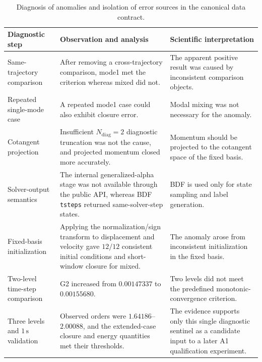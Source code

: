 \begin{table}[!ht]
\centering
\caption{Diagnosis of anomalies and isolation of error sources in the canonical data contract.}
\label{tab:canonical-diagnostic-chain}
\scriptsize
\begin{tabularx}{\textwidth}{@{}l>{\raggedright\arraybackslash}X>{\raggedright\arraybackslash}X@{}}
\toprule
Diagnostic step & Observation and analysis & Scientific interpretation \\
\midrule
Same-trajectory comparison & After removing a cross-trajectory comparison, mode1 met the criterion whereas mixed did not. & The apparent positive result was caused by inconsistent comparison objects. \\
Repeated single-mode case & A repeated mode1 case could also exhibit closure error. & Modal mixing was not necessary for the anomaly. \\
Cotangent projection & Insufficient \(N_{\mathrm{diag}}=2\) diagnostic truncation was not the cause, and projected momentum closed more accurately. & Momentum should be projected to the cotangent space of the fixed basis. \\
Solver-output semantics & The internal generalized-alpha stage was not available through the public API, whereas BDF \texttt{tsteps} returned same-solver-step states. & BDF is used only for state sampling and label generation. \\
Fixed-basis initialization & Applying the normalization/sign transform to displacement and velocity gave \(12/12\) consistent initial conditions and short-window closure for mixed. & The anomaly arose from inconsistent initialization in the fixed basis. \\
Two-level time-step comparison & G2 increased from \(0.00147337\) to \(0.00155680\). & Two levels did not meet the predefined monotonic-convergence criterion. \\
Three levels and \(1\,\mathrm{s}\) validation & Observed orders were \(1.64186\)--\(2.00088\), and the extended-case closure and energy quantities met their thresholds. & The evidence supports only this single diagnostic sentinel as a candidate input to a later A1 qualification experiment. \\
\bottomrule
\end{tabularx}
\end{table}
